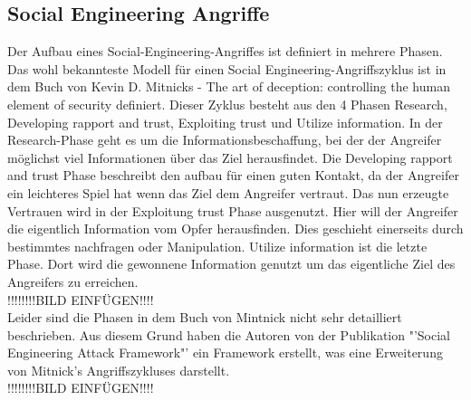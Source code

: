 \subsection{Social Engineering Angriffe}

Der Aufbau eines Social-Engineering-Angriffes ist definiert in mehrere Phasen. Das wohl bekannteste Modell für einen Social Engineering-Angriffszyklus ist in dem Buch von Kevin D. Mitnicks - The art of deception: controlling the human element of security \cite{ArtOfDeception} definiert. Dieser Zyklus besteht aus den 4 Phasen Research, Developing rapport and trust, Exploiting trust und Utilize information.
In der Research-Phase geht es um die Informationsbeschaffung, bei der der Angreifer möglichst viel Informationen über das Ziel herausfindet. Die Developing rapport and trust Phase beschreibt den aufbau für einen guten Kontakt, da der Angreifer ein leichteres Spiel hat wenn das Ziel dem Angreifer vertraut. Das nun erzeugte Vertrauen wird in der Exploitung trust Phase ausgenutzt. Hier will der Angreifer die eigentlich Information vom Opfer herausfinden. Dies geschieht einerseits durch bestimmtes nachfragen oder Manipulation. Utilize information ist die letzte Phase. Dort wird die gewonnene Information genutzt um das eigentliche Ziel des Angreifers zu erreichen.\\

!!!!!!!!BILD EINFÜGEN!!!!\\

Leider sind die Phasen in dem Buch von Mintnick \cite{ArtOfDeception} nicht sehr detailliert beschrieben. Aus diesem Grund haben die Autoren von der Publikation "'Social Engineering Attack Framework"' \cite{AttackFramework} ein Framework erstellt, was eine Erweiterung von Mitnick's Angriffszykluses darstellt.\\

!!!!!!!!BILD EINFÜGEN!!!!\\


